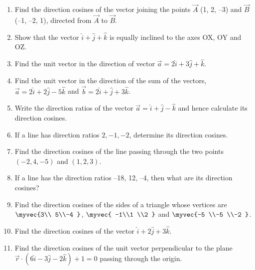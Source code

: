 \begin{enumerate}[label=\thesubsection.\arabic*, ref=\thesubsection.\theenumi]
		\\
		\solution
		
\item Find the direction cosines of the vector joining the points $\vec{A}$ (1,  2,  –3) and
$\vec{B}$(–1,  –2,  1),  directed from $\vec{A}$ to $\vec{B}$.
	\\
    \solution 
		
\item Show that the vector $\hat{i}+\hat{j}+\hat{k}$ is equally inclined to the axes OX,  OY and OZ.
	\\
\solution
		
\item Find the unit vector in the direction of vector $\overrightarrow{a} = 2\hat{i} +3\hat{j} +\hat{k}$.
\item Find the unit vector in the direction of the sum of the vectors, $\overrightarrow{a} = 2\hat{i} +2\hat{j} -5\hat{k}$ and $\overrightarrow{b} = 2\hat{i} +\hat{j} +3\hat{k}$.
\item Write the direction ratios of the vector $\overrightarrow{a} = \hat{i} +\hat{j} -\hat{k}$ and hence calculate its direction cosines.
\item If a line has direction ratios $2, -1, -2$, determine its direction cosines.
\item Find the direction cosines of the line passing through the two points $(-2, 4, -5)$ and $(1, 2, 3)$.
\item If a line has the direction ratios –18,  12,  –4,  then what are its direction cosines?
		\\
		\solution
		
	\item Find the direction cosines of the sides of a triangle whose vertices are $\myvec{3\\ 5\\-4 }$,  $\myvec{ -1\\1 \\2 }$ and $\myvec{-5 \\-5 \\-2 }$.
		\\
		\solution
		
\item Find the direction cosines of the vector $\hat{i}+2\hat{j}+3\hat{k}$.
	\\
    \solution 
		
\item Find the direction cosines of the unit vector perpendicular to the plane $\overrightarrow{r} \cdot(6 \hat{i}- 3 \hat{j}- 2 \hat{k})+ 1= 0$ passing through the origin.

\end{enumerate}
